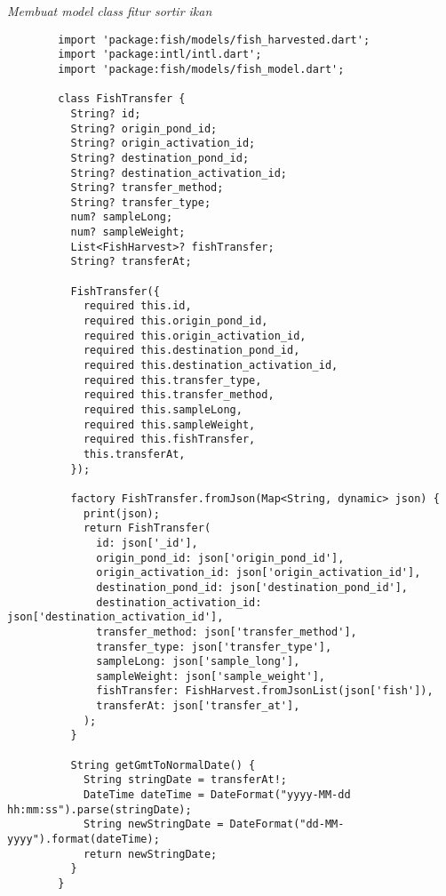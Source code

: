 	\textit{Membuat model class fitur sortir ikan}
	\begin{lstlisting}
        import 'package:fish/models/fish_harvested.dart';
        import 'package:intl/intl.dart';
        import 'package:fish/models/fish_model.dart';
        
        class FishTransfer {
          String? id;
          String? origin_pond_id;
          String? origin_activation_id;
          String? destination_pond_id;
          String? destination_activation_id;
          String? transfer_method;
          String? transfer_type;
          num? sampleLong;
          num? sampleWeight;
          List<FishHarvest>? fishTransfer;
          String? transferAt;
        
          FishTransfer({
            required this.id,
            required this.origin_pond_id,
            required this.origin_activation_id,
            required this.destination_pond_id,
            required this.destination_activation_id,
            required this.transfer_type,
            required this.transfer_method,
            required this.sampleLong,
            required this.sampleWeight,
            required this.fishTransfer,
            this.transferAt,
          });
        
          factory FishTransfer.fromJson(Map<String, dynamic> json) {
            print(json);
            return FishTransfer(
              id: json['_id'],
              origin_pond_id: json['origin_pond_id'],
              origin_activation_id: json['origin_activation_id'],
              destination_pond_id: json['destination_pond_id'],
              destination_activation_id: json['destination_activation_id'],
              transfer_method: json['transfer_method'],
              transfer_type: json['transfer_type'],
              sampleLong: json['sample_long'],
              sampleWeight: json['sample_weight'],
              fishTransfer: FishHarvest.fromJsonList(json['fish']),
              transferAt: json['transfer_at'],
            );
          }
        
          String getGmtToNormalDate() {
            String stringDate = transferAt!;
            DateTime dateTime = DateFormat("yyyy-MM-dd hh:mm:ss").parse(stringDate);
            String newStringDate = DateFormat("dd-MM-yyyy").format(dateTime);
            return newStringDate;
          }
        }          
	\end{lstlisting}


